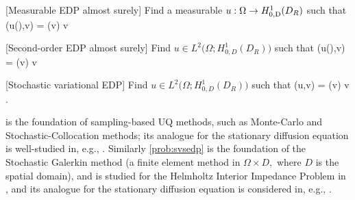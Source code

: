 [Measurable EDP almost surely]\label{prob:msedp}
Find a measurable $u:\Omega\rightarrow\HozDDR$ such that
\vspace{-2ex}
\beqs
{}\mleft(u(\omega),v\mright) = (v) \tforall v \in \HozDDR {}
\eeqs
\eprobvar

[Second-order EDP almost surely]\label{prob:somsedp}
Find $u\in L^2\big(\Omega;H_{0,D}^1(D_R)\big)$ such that
\beqs
{}\mleft(u(\omega),v\mright) = (v) \tforall v \in \HozDDR {}
\eeqs
\eprobvar

[Stochastic variational EDP]\label{prob:svsedp}
Find $u\in L^2\big(\Omega;H_{0,D}^1(D_R)\big)$ such that
\beqs
\as(u,v) = \Ls(v) \tforall v \in \LtOHozDDR.
\eeqs
\eprobvar


 is the foundation of sampling-based UQ methods, such as Monte-Carlo and Stochastic-Collocation methods; its analogue for the stationary diffusion equation is well-studied in, e.g., \cite{XiHe:05,BaNoTe:07,NoTeWe:08a,Ch:12,ChScTe:13,TeJaWeGu:15,KuNu:16,HeLaSc:18}. Similarly \cref{prob:svsedp} is the foundation of the Stochastic Galerkin method (a finite element method in $\Omega \times D,$ where $D$ is the spatial domain), and is studied for the Helmholtz Interior Impedance Problem in \cite{FeLiLo:15}, and its analogue for the stationary diffusion equation is considered in, e.g., \cite{BaTeZo:04,KhSc:11,BaScZo:11,GuWeZh:14}.

